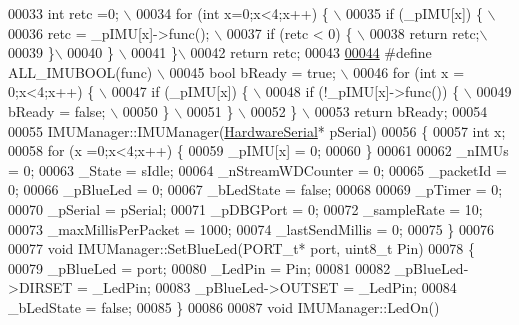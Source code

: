 \begin{DoxyCode}
00033 \textcolor{preprocessor}{    int retc =0; \(\backslash\)}
00034 \textcolor{preprocessor}{    for (int x=0;x<4;x++) \{ \(\backslash\)}
00035 \textcolor{preprocessor}{        if (\_pIMU[x]) \{         \(\backslash\)}
00036 \textcolor{preprocessor}{            retc = \_pIMU[x]->func();   \(\backslash\)}
00037 \textcolor{preprocessor}{            if (retc < 0) \{ \(\backslash\)}
00038 \textcolor{preprocessor}{                return retc;\(\backslash\)}
00039 \textcolor{preprocessor}{            \}\(\backslash\)}
00040 \textcolor{preprocessor}{        \}   \(\backslash\)}
00041 \textcolor{preprocessor}{    \}\(\backslash\)}
00042 \textcolor{preprocessor}{    return retc;}
00043 \textcolor{preprocessor}{}    
\hypertarget{_i_m_u_manager_8cpp_source_l00044}{}\hyperlink{_i_m_u_manager_8cpp_a1aa43791b69a2c420aed0eae2d0f45dc}{00044} \textcolor{preprocessor}{#define ALL\_IMUBOOL(func) \(\backslash\)}
00045 \textcolor{preprocessor}{    bool bReady = true; \(\backslash\)}
00046 \textcolor{preprocessor}{    for (int x = 0;x<4;x++) \{   \(\backslash\)}
00047 \textcolor{preprocessor}{        if (\_pIMU[x]) \{ \(\backslash\)}
00048 \textcolor{preprocessor}{            if (!\_pIMU[x]->func()) \{ \(\backslash\)}
00049 \textcolor{preprocessor}{                bReady = false; \(\backslash\)}
00050 \textcolor{preprocessor}{            \}   \(\backslash\)}
00051 \textcolor{preprocessor}{        \}   \(\backslash\)}
00052 \textcolor{preprocessor}{    \}   \(\backslash\)}
00053 \textcolor{preprocessor}{    return bReady;}
00054 \textcolor{preprocessor}{}
00055 IMUManager::IMUManager(\hyperlink{class_hardware_serial}{HardwareSerial}* pSerial)
00056 \{
00057     \textcolor{keywordtype}{int} x;
00058     \textcolor{keywordflow}{for} (x =0;x<4;x++) \{
00059         \_pIMU[x] = 0;
00060     \}
00061     
00062     \_nIMUs          = 0;
00063     \_State          = sIdle;
00064     \_nStreamWDCounter = 0;
00065     \_packetId       = 0;
00066     \_pBlueLed       = 0;
00067     \_bLedState      = \textcolor{keyword}{false};
00068 
00069     \_pTimer         = 0;
00070     \_pSerial        = pSerial;
00071     \_pDBGPort       = 0;
00072     \_sampleRate     = 10;
00073     \_maxMillisPerPacket = 1000;
00074     \_lastSendMillis = 0;
00075 \} 
00076 
00077 \textcolor{keywordtype}{void} IMUManager::SetBlueLed(PORT\_t* port, uint8\_t Pin)
00078 \{
00079     \_pBlueLed   = port;
00080     \_LedPin     = Pin;
00081     
00082     \_pBlueLed->DIRSET = \_LedPin;
00083     \_pBlueLed->OUTSET = \_LedPin;
00084     \_bLedState        = \textcolor{keyword}{false};
00085 \}
00086 
00087 \textcolor{keywordtype}{void} IMUManager::LedOn()

\end{DoxyCode}
